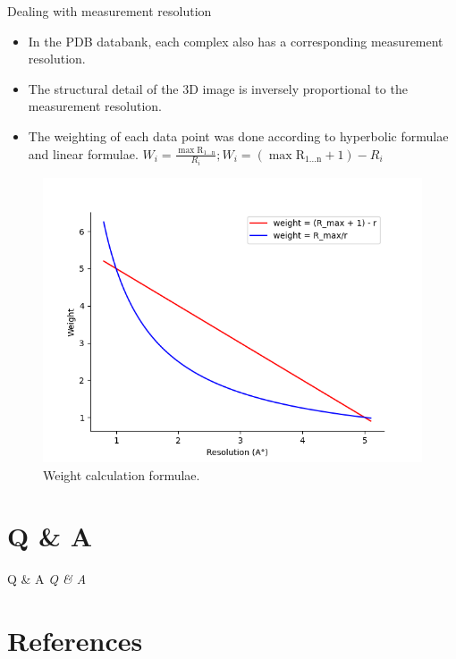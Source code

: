\documentclass{beamer}
\begin{document}
\begin{frame}[t]{Dealing with measurement resolution}
\begin{itemize}
\item In the PDB databank,  each complex also has a corresponding measurement resolution.
\item The structural
detail of the 3D image is inversely proportional to the measurement
resolution.
\item The weighting of each data point was done according to hyperbolic formulae and linear formulae.
$  W_i = \frac{ \mathrm{\max{R_{1 ...  n}}}}{R_i}  ;  W_i = (\mathrm{\max{R_{1 ...  n}}} + 1) - R_i $
\end{itemize}

\begin{figure}
     \centering
         \centering
    \includegraphics[scale=0.3]{images/graphingformula}
    \caption{Weight calculation formulae.}
    \label{fig:graphingformula}
\end{figure}

\end{frame}


\section{Q \& A}

\begin{frame}[t]{Q \& A}
  \centering \Huge
  \emph{Q \& A}
\end{frame}

\section{References}
\end{document}
